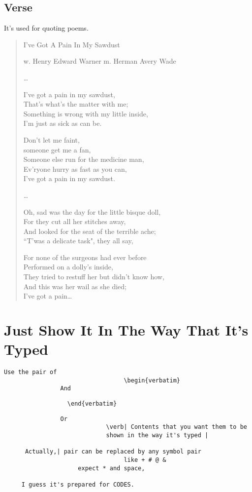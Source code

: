 \documentclass[a4paper]{report}
\begin{document}
\subsection{Verse}
It's used for quoting poems.

\begin{verse}
\begin{center}
I've Got A Pain In My Sawdust

w. Henry Edward Warner m. Herman Avery Wade
\end{center}

\ldots

I've got a pain in my sawdust, \\
That's what's the matter with me;\\
Something is wrong with my little inside,\\
I'm just as sick as can be.

Don't let me faint, \\
someone get me a fan,\\
Someone else run for the medicine man,\\
Ev'ryone hurry as fast as you can,\\
I've got a pain in my sawdust.

\ldots

Oh, sad was the day for the little bisque doll,\\
For they cut all her stitches away,\\
And looked for the seat of the terrible ache;\\
``T'was a delicate task", they all say,

For none of the surgeons had ever before\\
Performed on a dolly's inside,\\
They tried to restuff her but didn't know how,\\
And this was her wail as she died;\\
I've got a pain\ldots
\end{verse}

\section{Just Show It In The Way That It's Typed}
\begin{verbatim}
Use the pair of
                                  \begin{verbatim}
                And
\end{verbatim}
\verb|                  \end{verbatim}|
\begin{verbatim}
                Or
                             \verb| Contents that you want them to be
                             shown in the way it's typed |

      Actually,| pair can be replaced by any symbol pair
                                  like + # @ &
                     expect * and space,

     I guess it's prepared for CODES.
\end{verbatim}
\end{document}
